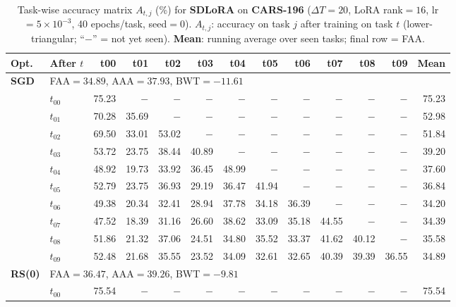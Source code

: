 \begin{table}[ht]
\centering
\caption{%
  Task-wise accuracy matrix $A_{t,j}$ (\%) for \textbf{SDLoRA} on \textbf{CARS-196} ($\Delta T=20$, LoRA rank$=16$, lr$=5\times10^{-3}$, 40 epochs/task, seed$=0$).
  $A_{t,j}$: accuracy on task $j$ after training on task $t$  (lower-triangular; ``$-$'' = not yet seen).
  \textbf{Mean}: running average over seen tasks; final row = FAA.
}
\label{tab:raw_sdlora_cars196}
\setlength{\tabcolsep}{2.8pt}
\renewcommand{\arraystretch}{0.88}
\scriptsize
\begin{tabular}{@{}l l r r r r r r r r r r r@{}}
\toprule
\textbf{Opt.} & \textbf{After $t$} & \textbf{t00} & \textbf{t01} & \textbf{t02} & \textbf{t03} & \textbf{t04} & \textbf{t05} & \textbf{t06} & \textbf{t07} & \textbf{t08} & \textbf{t09} & \textbf{Mean} \\
\midrule
\multirow{11}{*}{\textbf{SGD}} & \multicolumn{12}{l}{\quad\small FAA$=34.89$,\; AAA$=37.93$,\; BWT$=-11.61$} \\
 & $t_{00}$ & 75.23 & $-$ & $-$ & $-$ & $-$ & $-$ & $-$ & $-$ & $-$ & $-$ & 75.23 \\
 & $t_{01}$ & 70.28 & 35.69 & $-$ & $-$ & $-$ & $-$ & $-$ & $-$ & $-$ & $-$ & 52.98 \\
 & $t_{02}$ & 69.50 & 33.01 & 53.02 & $-$ & $-$ & $-$ & $-$ & $-$ & $-$ & $-$ & 51.84 \\
 & $t_{03}$ & 53.72 & 23.75 & 38.44 & 40.89 & $-$ & $-$ & $-$ & $-$ & $-$ & $-$ & 39.20 \\
 & $t_{04}$ & 48.92 & 19.73 & 33.92 & 36.45 & 48.99 & $-$ & $-$ & $-$ & $-$ & $-$ & 37.60 \\
 & $t_{05}$ & 52.79 & 23.75 & 36.93 & 29.19 & 36.47 & 41.94 & $-$ & $-$ & $-$ & $-$ & 36.84 \\
 & $t_{06}$ & 49.38 & 20.34 & 32.41 & 28.94 & 37.78 & 34.18 & 36.39 & $-$ & $-$ & $-$ & 34.20 \\
 & $t_{07}$ & 47.52 & 18.39 & 31.16 & 26.60 & 38.62 & 33.09 & 35.18 & 44.55 & $-$ & $-$ & 34.39 \\
 & $t_{08}$ & 51.86 & 21.32 & 37.06 & 24.51 & 34.80 & 35.52 & 33.37 & 41.62 & 40.12 & $-$ & 35.58 \\
 & $t_{09}$ & 52.48 & 21.68 & 35.55 & 23.52 & 34.09 & 32.61 & 32.65 & 40.39 & 39.39 & 36.55 & 34.89 \\
\midrule
\multirow{11}{*}{\textbf{RS(0)}} & \multicolumn{12}{l}{\quad\small FAA$=36.47$,\; AAA$=39.26$,\; BWT$=-9.81$} \\
 & $t_{00}$ & 75.54 & $-$ & $-$ & $-$ & $-$ & $-$ & $-$ & $-$ & $-$ & $-$ & 75.54 \\

\end{tabular}
\end{table}
